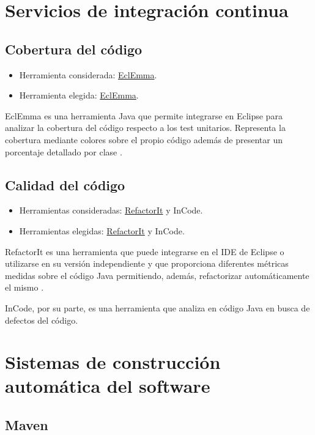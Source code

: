 \section{Servicios de integración continua}

\subsection{Cobertura del código}

\begin{itemize}
\tightlist
\item
  Herramienta considerada: \href{http://www.eclemma.org/}{EclEmma}.
\item
  Herramienta elegida: \href{http://www.eclemma.org/}{EclEmma}.
\end{itemize}

EclEmma es una herramienta Java que permite integrarse en Eclipse para analizar la cobertura del código respecto a los test unitarios. Representa la cobertura mediante colores sobre el propio código además de presentar un porcentaje detallado por clase \cite{eclemma:info}.

\subsection{Calidad del código}

\begin{itemize}
\tightlist
\item
  Herramientas consideradas: \href{https://sourceforge.net/projects/refactorit/}{RefactorIt} y InCode.
\item
  Herramientas elegidas: \href{https://sourceforge.net/projects/refactorit/}{RefactorIt} y InCode.
\end{itemize}

RefactorIt es una herramienta que puede integrarse en el IDE de Eclipse o utilizarse en su versión independiente y que proporciona diferentes métricas medidas sobre el código Java permitiendo, además, refactorizar automáticamente el mismo \cite{refacit:source}.

InCode, por su parte, es una herramienta que analiza en código Java en busca de defectos del código.

\section{Sistemas de construcción automática del software}

\subsection{Maven}

